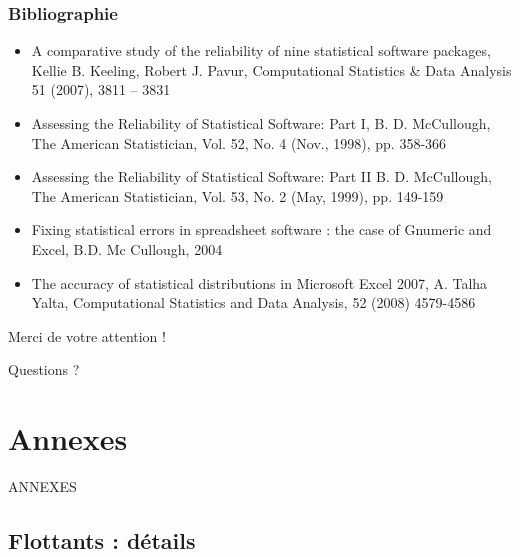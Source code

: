 \documentclass{beamer}
\begin{document}
\begin{frame}
\frametitle{Bibliographie}

\begin{itemize}
\item A comparative study of the reliability of nine statistical 
software packages, Kellie B. Keeling, Robert J. Pavur, 
Computational Statistics \& Data Analysis 51 (2007), 3811 – 3831
\item Assessing the Reliability of Statistical Software: Part I, 
B. D. McCullough, The American Statistician, Vol. 52, 
No. 4 (Nov., 1998), pp. 358-366
\item Assessing the Reliability of Statistical Software: Part II
B. D. McCullough, The American Statistician, Vol. 53, 
No. 2 (May, 1999), pp. 149-159
\item Fixing statistical errors in spreadsheet software : the 
case of Gnumeric and Excel, B.D. Mc Cullough, 2004
\item The accuracy of statistical distributions in Microsoft 
Excel 2007, A. Talha Yalta, Computational Statistics and Data Analysis, 
 52 (2008) 4579-4586
\end{itemize}
  
\end{frame}


\begin{frame}

Merci de votre attention !

Questions ?
  
\end{frame}


\section{Annexes}

\begin{frame}

\begin{center}
ANNEXES
\end{center}
  
\end{frame}

\subsection{Flottants : détails}
\end{document}
